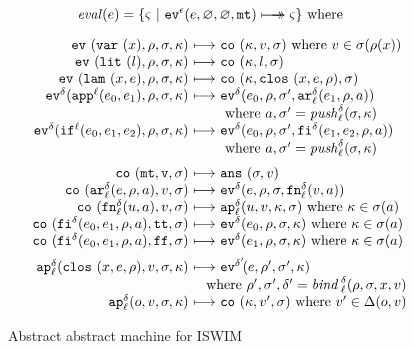 \documentclass[preprint,onecolumn,9pt]{sigplanconf} %
\begin{document}
\begin{figure}
\begin{gather*}
\begin{align*}
\mathit{eval}(\mexp) &= \{ \mstate\ |\ \ev[^{\mtcntr}]{\mexp,\varnothing,\varnothing,\kmt} \multimachstep \mstate \} \text{ where }
\end{align*}
\\[2mm]
\begin{array}{@{}r@{\ }c@{\ }l@{}}
\ev{\svar\mvar,\menv,\msto,\mkont} &\machstep&
\co{\mkont,\mval,\msto}
\text{ where }\mval \in \msto(\menv(\mvar))
\\
\ev{\slit\mlit,\menv,\msto,\mkont} &\machstep&
\co{\mkont,\mlit,\msto}
\\
\ev{\slam\mvar\mexp,\menv,\msto,\mkont} &\machstep&
\co{\mkont,\clos{\mvar,\mexp,\menv},\msto}
\\
\ev[^\mcntr]{\sapp[^\mlab]{\mexpi0}{\mexpi1},\menv,\msto,\mkont} &\machstep&
\ev[^\mcntr]{\mexpi{0},\menv,\msto',\kar[_\mlab^\mcntr]{\mexpi{1},\menv,\maddr}}
\\
&&
\text{ where }\maddr,\msto' = \mathit{push}^\mcntr_\mlab(\msto,\mkont)
\\
\ev[^\mcntr]{\sif[^\mlab]{\mexpi0}{\mexpi1}{\mexpi2},\menv,\msto,\mkont} &\machstep&
\ev[^\mcntr]{\mexpi0,\menv,\msto',\kif[^\mcntr]{\mexpi1,\mexpi2,\menv,\maddr}}
\\
&&
\text{ where }\maddr,\msto' = \mathit{push}_\mlab^\mcntr(\msto,\mkont)
\\[2mm]
\co{\kmt,\mval,\msto} &\machstep&
\ans{\msto,\mval}
\\
\co{\kar[^\mcntr_\mlab]{\mexp,\menv,\maddr},\mval,\msto} & \machstep&
\ev[^\mcntr]{\mexp,\menv,\msto,\kfn[^\mcntr_\mlab]{\mval,\maddr}}
\\
\co{\kfn[^\mcntr_\mlab]{{\mvalx{u}},\maddr},\mval,\msto} & \machstep&
\ap[^\mcntr_\mlab]{\mvalx{u},\mval,\mkont,\msto}
\text{ where }\mkont \in \msto(\maddr)
\\
\co{\kif[^\mcntr]{\mexpi0,\mexpi1,\menv,\maddr},\strue,\msto} & \machstep&
\ev[^\mcntr]{\mexpi0,\menv,\msto,\mkont}
\text{ where }\mkont\in\msto(\maddr)
\\
\co{\kif[^\mcntr]{\mexpi0,\mexpi1,\menv,\maddr},\sfalse,\msto} & \machstep&
\ev[^\mcntr]{\mexpi1,\menv,\msto,\mkont}
\text{ where }\mkont\in\msto(\maddr)
\\[2mm]
\ap[^\mcntr_\mlab]{\clos{\mvar,\mexp,\menv},\mval,\msto,\mkont} & \machstep&
\ev[^{\mcntr'}\!]{\mexp,\menv',\msto',\mkont}
\\
\multicolumn{3}{r@{}}{
\text{ where }\menv',\msto',\mcntr' = \mathit{bind\,}^{ \mcntr}_\mlab(\menv,\msto,\mvar,\mval)}
\\
\ap[^\mcntr_\mlab]{\mop,\mval,\msto,\mkont} & \machstep&
\co{\mkont,\mval',\msto}
\text{ where } \mval'\in\interpdelta(\mop,\mval)
\end{array}
\end{gather*}
\caption{Abstract abstract machine for ISWIM}
\label{fig:aam}
\end{figure}
\end{document}

